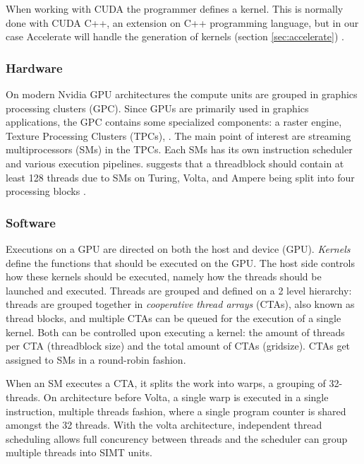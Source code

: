 \documentclass{article}
\newcommand{\TODO}[1]{\noindent{\color{red}\textbf{[TODO] #1}}}
\begin{document}
When working with CUDA the programmer defines a kernel.
This is normally done with CUDA C++, an extension on C++ programming language, but in our case Accelerate will handle the generation of kernels (section \ref{sec:accelerate}) \cite{nvidia2021cudadocs}.

\subsubsection{Hardware}
On modern Nvidia GPU architectures the compute units are grouped in graphics processing clusters (GPC).
Since GPUs are primarily used in graphics applications, the GPC contains some specialized components: a raster engine, Texture Processing Clusters (TPCs), \TODO{\dots}.
The main point of interest are streaming multiprocessors (SMs) in the TPCs.
Each SMs has its own instruction scheduler and various execution pipelines.
\citeauthor{jia2019dissecting} suggests that a threadblock should contain at least 128 threads due to SMs on Turing, Volta, and Ampere being split into four processing blocks \cite{jia2019dissecting,nvidia2017volta,nvidia2018turing,nvidia2020ampere}.

\TODO{More specific + figure}

\subsubsection{Software}
Executions on a GPU are directed on both the host and device (GPU).
\textit{Kernels} define the functions that should be executed on the GPU.
The host side controls how these kernels should be executed, namely how the threads should be launched and executed.
Threads are grouped and defined on a 2 level hierarchy: threads are grouped together in \textit{cooperative thread arrays} (CTAs), also known as thread blocks, and multiple CTAs can be queued for the execution of a single kernel.
Both can be controlled upon executing a kernel: the amount of threads per CTA (threadblock size) and the total amount of CTAs (gridsize).
CTAs get assigned to SMs in a round-robin fashion.

When an SM executes a CTA, it splits the work into warps, a grouping of 32-threads.
On architecture before Volta, a single warp is executed in a single instruction, multiple threads fashion, where a single program counter is shared amongst the 32 threads.
With the volta architecture, independent thread scheduling allows full concurency between threads and the scheduler can group multiple threads into SIMT units.
\end{document}
